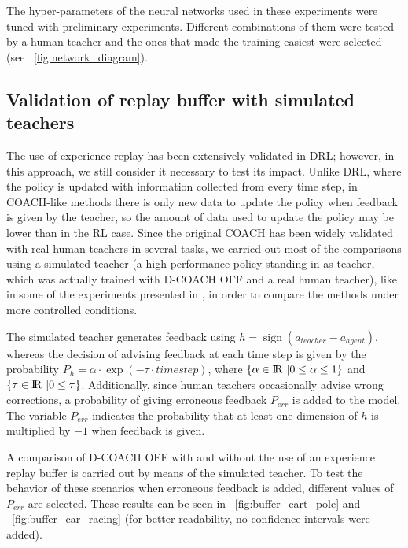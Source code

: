 The hyper-parameters of the neural networks used in these experiments were tuned with preliminary experiments. Different combinations of them were tested by a human teacher and the ones that made the training easiest were selected (see \figurename~{\ref{fig:network_diagram}}).

\newpage

\subsection{Validation of replay buffer with simulated teachers}
The use of experience replay has been extensively validated in DRL; however, in this approach, we  still consider it necessary to test its impact. Unlike DRL, where the policy is updated with information collected from every time step, in COACH-like methods there is only new data to update the policy when feedback is given by the teacher, so the amount of data used to update the policy may be lower than in the RL case. Since the original COACH has been widely validated with real human teachers in several tasks, we carried out most of the comparisons using  a simulated teacher (a high performance policy standing-in as teacher, which was actually trained with D-COACH OFF and a real human teacher), like in some of the experiments presented in \cite{Celemin2018AnInteractive}, in order to compare the methods under more controlled conditions. 

The simulated teacher generates feedback using $h = \operatorname{sign}(a_{\mathit{teacher}} - a_{\mathit{agent}})$, whereas the decision of advising feedback at each time step is given by the probability $P_{h} = \alpha \cdot\exp(-\tau\cdot \mathit{timestep})$, where $\{\alpha \in {\rm I\!R}\ | 0 \le \alpha \le 1\}$ and $\{\tau \in {\rm I\!R}\ | 0 \le \tau\}$. Additionally, since human teachers occasionally advise wrong corrections, a probability of giving erroneous feedback $P_{\mathit{err}}$ is added to the model. The variable $P_{\mathit{err}}$ indicates the probability that at least one dimension of $h$ is multiplied by $-1$ when feedback is given.

A comparison of D-COACH OFF with and without the use of an experience replay buffer is carried out by means of the simulated teacher. To test the behavior of these scenarios when erroneous feedback is added, different values of $P_{\mathit{err}}$ are selected. These results can be seen in \figurename~{\ref{fig:buffer_cart_pole}} and \figurename~{\ref{fig:buffer_car_racing}} (for better readability, no confidence intervals were added).

